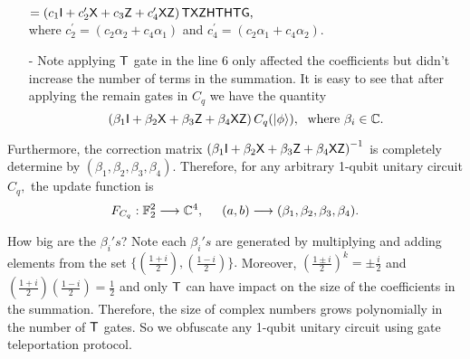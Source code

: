 \begin{enumerate}
 \hspace{2.3in}   $=\left(c_1{\sf I}+ c_2^\prime{\sf X}+c_3{\sf Z}+c_4^\prime{\sf X}{\sf Z}\right){\sf T} {\sf X}{\sf Z}{\sf H}{\sf T}{\sf H} {\sf T} \textsf{G},$ \\
  where $c_2^\prime=(c_2\alpha_2+c_4\alpha_1)$ and $c_4^\prime=(c_2\alpha_1+c_4\alpha_2).$
\item[-] Note applying ${\sf T}$ gate in the line 6 only affected the coefficients but didn't increase the number of terms in the summation. It is easy to see that after applying the remain gates in $C_q$ we  have the quantity
$$\left(\beta_1 {\sf I}+\beta_2 {\sf X}+\beta_3 {\sf Z}+\beta_4 {\sf X} {\sf Z}\right) C_q({\lvert}\phi\rangle), \; \mbox{ where } \beta_i\in \mathbb{C}.$$
\end{enumerate}
Furthermore, the correction matrix $\left(\beta_1 {\sf I}+\beta_2 {\sf X}+\beta_3 {\sf Z}+\beta_4 {\sf X} {\sf Z}\right)^{-1}$  is completely determine by $(\beta_1, \beta_2, \beta_3, \beta_4).$ Therefore, for any arbitrary 1-qubit unitary circuit $C_q,$ the update function is $$F_{C_q}: \mathbb{F}_2^2 \longrightarrow \mathbb{C}^4,\hspace{0.5cm} (a,b)\longrightarrow (\beta_1,\beta_2,\beta_3, \beta_4).$$

%
%


How big  are the $\beta_i's $? Note each $\beta_i's$ are generated by multiplying and adding elements from the set $\{\left(\frac{1+i}{2}\right), \left(\frac{1-i}{2}\right)\}.$ Moreover, $\left(\frac{1\pm i}{2}\right)^k=\pm \frac{i}{2}$ and
$\left(\frac{1+ i}{2}\right)\left(\frac{1- i}{2}\right)=\frac{1}{2}$ and only ${\sf T}$ can have impact on the size of the coefficients in the summation. Therefore, the size of complex numbers grows polynomially in the number of ${\sf T}$ gates.
So we obfuscate any 1-qubit unitary circuit using gate teleportation protocol. 

